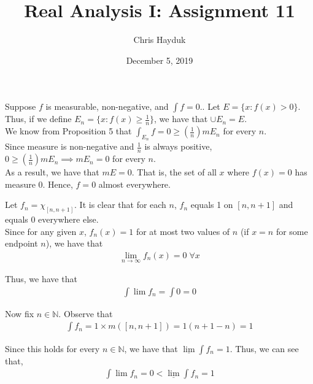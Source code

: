 \documentclass[12pt]{article}
\newenvironment{problem}[2][Problem]{\begin{trivlist}
\item[\hskip \labelsep {\bfseries #1}\hskip \labelsep {\bfseries #2.}]}{\end{trivlist}}
\begin{document}
\title{Real Analysis I: Assignment 11}

\author{Chris Hayduk}
\date{December 5, 2019}

\maketitle

\begin{problem}{1}
\end{problem}

Suppose $f$ is measurable, non-negative, and $\int f = 0$.. Let $E = \{x: f(x) > 0\}$. Thus, if we define $E_n = \{x: f(x) \geq \frac{1}{n}\}$, we have that $\cup E_n = E$.\\

We know from Proposition 5 that $\int_{E_n} f = 0 \geq \left(\frac{1}{n}\right) mE_n$ for every $n$.\\

Since measure is non-negative and $\frac{1}{n}$ is always positive, $0 \geq \left(\frac{1}{n}\right) mE_n \implies mE_n = 0$ for every $n$.\\

As a result, we have that $mE = 0$. That is, the set of all $x$ where $f(x) = 0$ has measure 0. Hence, $f = 0$ almost everywhere.

\begin{problem}{2}
\end{problem}

\begin{problem}{3}
\end{problem}

\begin{problem}{4}
\end{problem}

Let $f_n = \chi_{[n, n+1]}$. It is clear that for each $n$, $f_n$ equals 1 on $[n, n+1]$ and equals 0 everywhere else.\\

Since for any given $x$, $f_n(x) = 1$ for at most two values of $n$ (if $x = n$ for some endpoint $n$), we have that
\begin{align*}
\lim_{n \to \infty} f_n(x) = 0 \; \forall x
\end{align*} 

Thus, we have that
\begin{align*}
\int \lim f_n = \int 0 = 0
\end{align*}

Now fix $n \in \mathbb{N}$. Observe that
\begin{align*}
\int f_n = 1 \times m([n, n+1]) = 1 (n + 1 - n) = 1
\end{align*}

Since this holds for every $n \in \mathbb{N}$, we have that $\underline{\lim} \int f_n = 1$. Thus, we can see that,
\begin{align*}
\int \lim f_n = 0 < \underline{\lim} \int f_n = 1
\end{align*}
\end{document}
